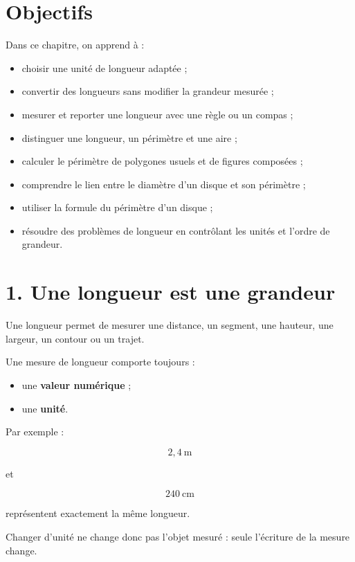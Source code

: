 
\section{Objectifs}

Dans ce chapitre, on apprend à :

\begin{itemize}
\item choisir une unité de longueur adaptée ;
\item convertir des longueurs sans modifier la grandeur mesurée ;
\item mesurer et reporter une longueur avec une règle ou un compas ;
\item distinguer une longueur, un périmètre et une aire ;
\item calculer le périmètre de polygones usuels et de figures composées ;
\item comprendre le lien entre le diamètre d’un disque et son périmètre ;
\item utiliser la formule du périmètre d’un disque ;
\item résoudre des problèmes de longueur en contrôlant les unités et l’ordre de grandeur.
\end{itemize}

\section{1. Une longueur est une grandeur}

Une longueur permet de mesurer une distance, un segment, une hauteur, une largeur, un contour ou un trajet.

Une mesure de longueur comporte toujours :

\begin{itemize}
\item une \textbf{valeur numérique} ;
\item une \textbf{unité}.
\end{itemize}

Par exemple :

\[
2{,}4\ \text{m}
\]

et

\[
240\ \text{cm}
\]

représentent exactement la même longueur.

Changer d’unité ne change donc pas l’objet mesuré : seule l’écriture de la mesure change.

